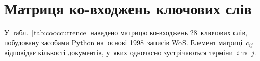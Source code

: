 
\appendix
\renewcommand{\sectionprefix}{ДОДАТОК~}
\renewcommand{\thesection}{\Asbuk{section}}


\section{Матриця ко-входжень ключових слів}
\label{app:cooccurrence}

У~табл.~\ref{tab:cooccurrence} наведено матрицю ко-входжень 28~ключових слів, побудовану засобами Python на~основі 1998~записів WoS. Елемент матриці~$c_{ij}$ відповідає кількості документів, у~яких одночасно зустрічаються терміни~$i$ та~$j$.

